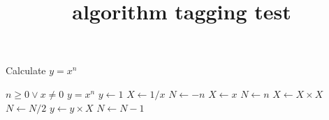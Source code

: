 \documentclass{article}
\title{algorithm tagging test}
\begin{document}
\listofalgorithms

\begin{algorithm}
\caption{Calculate $y = x^n$}
\label{alg1}
\begin{algorithmic}
\REQUIRE $n \geq 0 \vee x \neq 0$
\ENSURE $y = x^n$
\STATE $y \leftarrow 1$
\STATE $X \leftarrow 1 / x$
\STATE $N \leftarrow -n$
\ELSE
\STATE $X \leftarrow x$
\STATE $N \leftarrow n$
\ENDIF
{}
\STATE $X \leftarrow X \times X$
\STATE $N \leftarrow N / 2$
\ELSE[$N$ is odd]
\STATE $y \leftarrow y \times X$
\STATE $N \leftarrow N - 1$
\ENDIF
\ENDWHILE
\end{algorithmic}
\end{algorithm}
\end{document}
